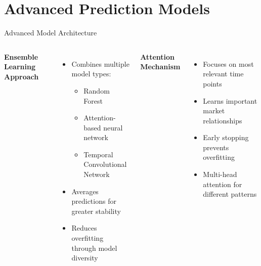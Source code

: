 \documentclass[aspectratio=169,xcolor=dvipsnames]{beamer}
\begin{document}
\section{Advanced Prediction Models}
\begin{frame}{Advanced Model Architecture}
    \begin{columns}[c]
        \textbf{Ensemble Learning Approach}
        \begin{itemize}
            \item Combines multiple model types:
                  \begin{itemize}
                      \item Random Forest
                      \item Attention-based neural network
                      \item Temporal Convolutional Network
                  \end{itemize}
            \item Averages predictions for greater stability
            \item Reduces overfitting through model diversity
        \end{itemize}

        \textbf{Attention Mechanism}
        \begin{itemize}
            \item Focuses on most relevant time points
            \item Learns important market relationships
            \item Early stopping prevents overfitting
            \item Multi-head attention for different patterns
        \end{itemize}
    \end{columns}
\end{frame}
\end{document}
